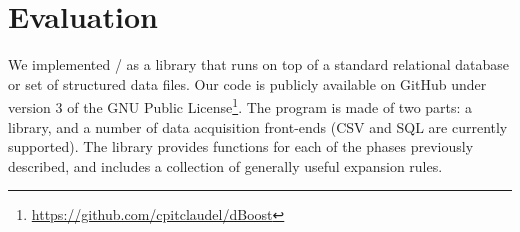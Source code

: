 \section{Evaluation}
\label{sec:evaluation}


We implemented \dBoost/ as a library that runs on top of a standard relational database or set of structured data files. Our code is publicly available on GitHub under version 3 of the GNU Public License\footnote{\url{https://github.com/cpitclaudel/dBoost}}. The program is made of two parts: a library, and a number of data acquisition front-ends (CSV and SQL are currently supported). The library provides functions for each of the phases previously described, and includes a collection of generally useful expansion rules.


%

